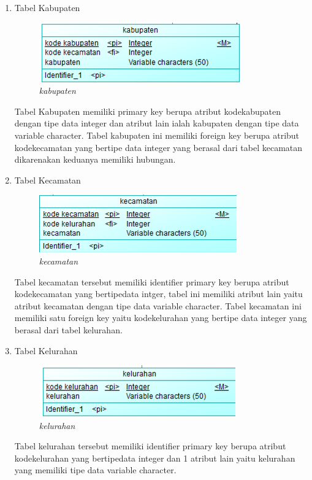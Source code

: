\documentclass[12pt,a4paper,bahasa]{article}
\begin{document}
\begin{enumerate}
	\item Tabel Kabupaten\\
\begin{figure}[!htbp]
\centering
\includegraphics[scale=1.5]{gambar/kab.png}
\caption{\textit{kabupaten}}
\label{kabupaten}
\end{figure}	
	
Tabel Kabupaten  memiliki primary key berupa atribut kodekabupaten dengan tipe data integer dan atribut lain ialah kabupaten dengan tipe data variable character. Tabel kabupaten ini memiliki foreign key berupa atribut kodekecamatan yang bertipe data integer yang berasal dari tabel kecamatan dikarenakan keduanya memiliki hubungan.

	\item Tabel Kecamatan\\
\begin{figure}[!htbp]
\centering
\includegraphics[scale=1.5]{gambar/kec.png}
\caption{\textit{kecamatan}}
\label{kecamatan}
\end{figure}	

Tabel kecamatan tersebut memiliki identifier primary key berupa atribut kodekecamatan yang bertipedata intger, tabel ini memiliki atribut lain yaitu atribut kecamatan dengan tipe data variable character. Tabel kecamatan ini memiliki satu foreign key yaitu kodekelurahan yang bertipe data integer yang berasal dari tabel kelurahan.

\item Tabel Kelurahan\\
\begin{figure}[!htbp]
\centering
\includegraphics[scale=1.5]{gambar/kel.png}
\caption{\textit{kelurahan}}
\label{kelurahan}
\end{figure}
		Tabel kelurahan tersebut memiliki identifier primary key berupa atribut kodekelurahan yang bertipedata integer dan 1 atribut lain yaitu kelurahan yang memiliki tipe data variable character.


\end{enumerate}
\end{document}
